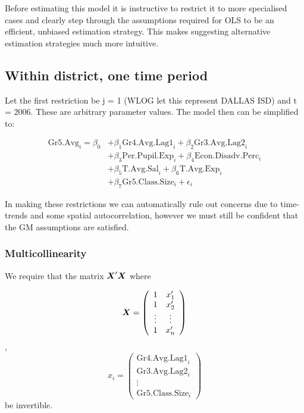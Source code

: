\documentclass[11pt]{article}
\newcommand{\bX}{\mbox{\boldmath $X$}}
\begin{document}
Before estimating this model it is instructive to restrict it to more specialised cases and clearly step through the assumptions required for OLS to be an efficient, unbiased estimation strategy. This makes suggesting alternative estimation strategies much more intuitive.

\subsection{Within district, one time period}
\label{ss:nextsub1}

Let the first restriction be j = 1 (WLOG let this represent DALLAS ISD) and t = 2006. These are arbitrary parameter values. The model then can be simplified to:
  
  \begin{align*}
\mathrm{Gr5.Avg}_{i} = \beta_{0} 
&+ \beta_{1}  \mathrm{Gr4.Avg.Lag1}_{i} 
+ \beta_{2}  \mathrm{Gr3.Avg.Lag2}_{i}    \\
&+ \beta_{3}  \mathrm{Per.Pupil.Exp}_{i} 
+ \beta_{4}  \mathrm{Econ.Disadv.Perc}_{i} \\
&+ \beta_{5}  \mathrm{T.Avg.Sal}_{i}   
+ \beta_{6}  \mathrm{T.Avg.Exp}_{i}  \\
&+ \beta_{7}  \mathrm{Gr5.Class.Size}_{i} + \epsilon_{i}
\end{align*}

In making these restrictions we can automatically rule out concerns due to time-trends and some spatial autocorrelation, however we must still be confident that the GM assumptions are satisfied.

\subsubsection{Multicollinearity}

We require that the matrix $\bX'\bX$ where

$$\bX = \left( \begin{array}{cc}
1 & x_1' \\ 1 & x_2' \\ \vdots & \vdots \\ 1 & x_n' \end{array}
\right)$$,    
$$x_i = \left( \begin{array}{cc}
              \mathrm{Gr4.Avg.Lag1}_{i} \\  \mathrm{Gr3.Avg.Lag2}_{i} \\ \vdots \\ \mathrm{Gr5.Class.Size}_{i} \end{array}
              \right)$$ be invertible. 
\end{document}
